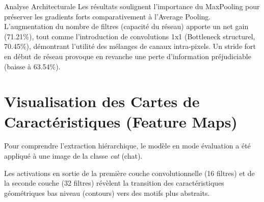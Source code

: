 \begin{alertblock}{Analyse Architecturale}
Les résultats soulignent l'importance du MaxPooling pour préserver les gradients forts comparativement à l'Average Pooling. L'augmentation du nombre de filtres (capacité du réseau) apporte un net gain (71.21\%), tout comme l'introduction de convolutions 1x1 (Bottleneck structurel, 70.45\%), démontrant l'utilité des mélanges de canaux intra-pixels. Un stride fort en début de réseau provoque en revanche une perte d'information préjudiciable (baisse à 63.54\%).
\end{alertblock}

\section{Visualisation des Cartes de Caractéristiques (Feature Maps)}

Pour comprendre l'extraction hiérarchique, le modèle en mode évaluation a été appliqué à une image de la classe \emph{cat} (chat).


Les activations en sortie de la première couche convolutionnelle (16 filtres) et de la seconde couche (32 filtres) révèlent la transition des caractéristiques géométriques bas niveau (contours) vers des motifs plus abstraits.


